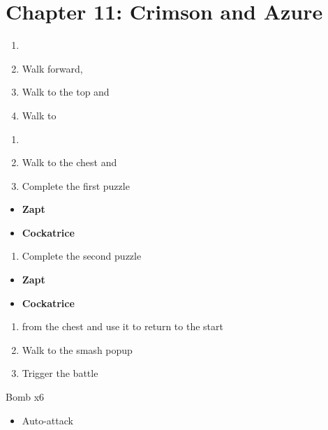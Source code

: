 \chapter{Chapter 11: Crimson and Azure}
\begin{enumerate}
    \item \cs\
    \item Walk forward, \cs\
    \item Walk to the top and 
    \item Walk to 
\end{enumerate}
\begin{enumerate}[resume]
    \item \cs\
    \item Walk to the chest and 
    \item Complete the first puzzle
\end{enumerate}
\begin{puzzle}
    \begin{itemize}
        \item \textbf{Zapt}
        \item \textbf{Cockatrice}
    \end{itemize}
\end{puzzle}
\begin{enumerate}[resume]
    \item Complete the second puzzle
\end{enumerate}
\begin{puzzle}
    \begin{itemize}
        \item \textbf{Zapt}
        \item \textbf{Cockatrice}
    \end{itemize}
\end{puzzle}
\begin{enumerate}[resume]
    \item {} from the chest and use it to return to the start
    \item Walk to the smash popup
    \item Trigger the battle
\end{enumerate}
\begin{battle}[]{Bomb x6}
    \begin{itemize}
        \reynnf\ Fish Scale
        \lannf\ Fish Scale
        \item Auto-attack
    \end{itemize}
\end{battle}
